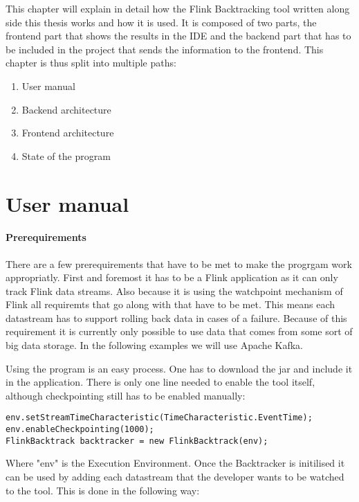 This chapter will explain in detail how the Flink Backtracking tool written along side this thesis works and how it is used. It is composed of two parts, the frontend part that shows the results in the IDE and the backend part that has to be included in the project that sends the information to the frontend. This chapter is thus split into multiple paths:
\begin{enumerate}
  \item[\ref{fbManual}] User manual
  \item[\ref{fbBackend}] Backend architecture
  \item[\ref{fbFrontend}] Frontend architecture
  \item[\ref{fbState}] State of the program
\end{enumerate}

\section{User manual}
\label{fbManual}

\paragraph{Prerequirements} There are a few prerequirements that have to be met to make the progrgam work appropriatly. First and foremost it has to be a Flink application as it can only track Flink data streams. Also because it is using the watchpoint mechanism of Flink all requiremts that go along with that have to be met. This means each datastream has to support rolling back data in cases of a failure. Because of this requirement it is currently only possible to use data that comes from some sort of big data storage. In the following examples we will use Apache Kafka.

Using the program is an easy process. One has to download the jar and include it in the application. There is only one line needed to enable the tool itself, although checkpointing still has to be enabled manually:

\begin{lstlisting}
env.setStreamTimeCharacteristic(TimeCharacteristic.EventTime);
env.enableCheckpointing(1000);
FlinkBacktrack backtracker = new FlinkBacktrack(env);
\end{lstlisting}

Where "env" is the Execution Environment. Once the Backtracker is initilised it can be used by adding each datastream that the developer wants to be watched to the tool. This is done in the following way:

